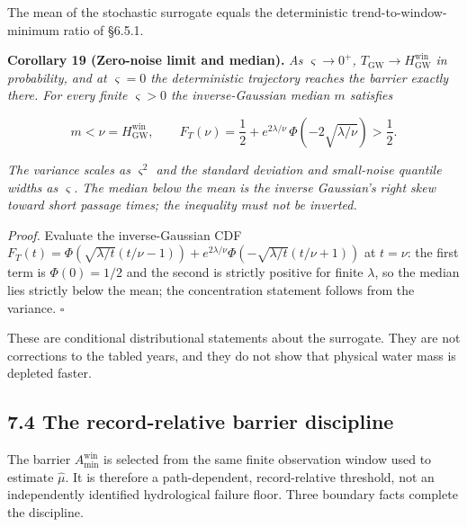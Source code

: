 \documentclass[11pt]{article}
\begin{document}
The mean of the stochastic surrogate equals the deterministic trend-to-window-minimum ratio of \S6.5.1.

\textbf{Corollary 19 (Zero-noise limit and median).} \emph{As \(\varsigma \to 0^+\), \(T_{\mathrm{GW}} \to H^{\mathrm{win}}_{\mathrm{GW}}\) in probability, and at \(\varsigma = 0\) the deterministic trajectory reaches the barrier exactly there. For every finite \(\varsigma > 0\) the inverse-Gaussian median \(m\) satisfies} 

$$m < \nu = H^{\mathrm{win}}_{\mathrm{GW}}, \qquad F_T(\nu) = \frac{1}{2} + e^{2\lambda/\nu}\,\Phi\!\left( -2\sqrt{\lambda/\nu} \right) > \frac{1}{2}.$$

 \emph{The variance scales as \(\varsigma^2\) and the standard deviation and small-noise quantile widths as \(\varsigma\). The median below the mean is the inverse Gaussian's right skew toward short passage times; the inequality must not be inverted.}

\emph{Proof.} Evaluate the inverse-Gaussian CDF \(F_T(t) =\allowbreak{} \Phi(\sqrt{\lambda/\allowbreak{}t}(t/\nu - 1)) +\allowbreak{} e^{2\lambda/\nu}\Phi(-\sqrt{\lambda/\allowbreak{}t}(t/\nu +\allowbreak{} 1))\) at \(t = \nu\): the first term is \(\Phi(0) = 1/\allowbreak{}2\) and the second is strictly positive for finite \(\lambda\), so the median lies strictly below the mean; the concentration statement follows from the variance. \(\square\)

These are conditional distributional statements about the surrogate. They are not corrections to the tabled years, and they do not show that physical water mass is depleted faster.

\subsection*{7.4 The record-relative barrier discipline}\label{74-the-record-relative-barrier-discipline}

The barrier \(A_{\min}^{\mathrm{win}}\) is selected from the same finite observation window used to estimate \(\widehat\mu\). It is therefore a path-dependent, record-relative threshold, not an independently identified hydrological failure floor. Three boundary facts complete the discipline.
\end{document}
